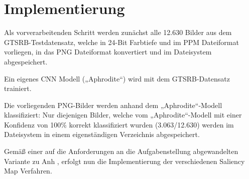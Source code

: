 %
%
%
%


\section{Implementierung}

Als vorverarbeitenden Schritt werden zunächst alle 12.630 Bilder aus dem GTSRB-Testdatensatz, welche in 24-Bit Farbtiefe und im \ac{PPM} Dateiformat vorliegen, in das \ac{PNG} Dateiformat konvertiert und im Dateisystem abgespeichert.


Ein eigenes \ac{CNN} Modell („Aphrodite“) wird mit dem \ac{GTSRB}-Datensatz trainiert.

Die  vorliegenden \ac{PNG}-Bilder werden anhand dem „Aphrodite“-Modell klassifiziert:
Nur diejenigen Bilder, welche vom „Aphrodite“-Modell mit einer Konfidenz von 100\% korrekt klassifiziert wurden (3.063/12.630) werden im Dateisystem in einem eigenständigen Verzeichnis abgespeichert.


Gemäß einer auf die Anforderungen an die Aufgabenstellung abgewandelten Variante zu Anh \cite{anh_implementations_2019}, erfolgt nun die Implementierung der verschiedenen Saliency Map Verfahren.


